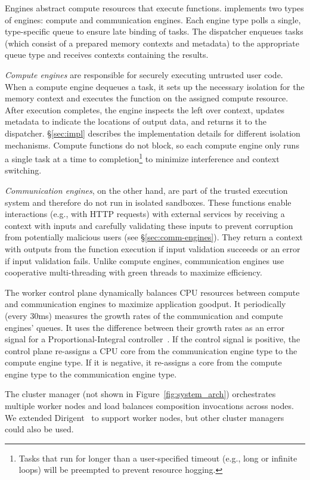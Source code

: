 Engines abstract compute resources that execute functions.
\dandelion implements two types of engines: compute and communication engines. 
Each engine type polls a single, type-specific queue to ensure late binding of tasks.
The dispatcher enqueues tasks (which consist of a prepared memory contexts and metadata) to the appropriate queue type and receives contexts containing the results.

\textit{Compute engines} are responsible for securely executing untrusted user code.
When a compute engine dequeues a task, it sets up the necessary isolation for the memory context and executes the function on the assigned compute resource.
After execution completes, the engine inspects the left over context, updates metadata to indicate the locations of output data, and returns it to the dispatcher. 
\S\ref{sec:impl} describes the implementation details for different isolation mechanisms.
Compute functions do not block, so each compute engine only runs a single task at a time to completion\footnote{Tasks that run for longer than a user-specified timeout (e.g., long or infinite loops) will be preempted to prevent resource hogging.} to minimize interference and context switching.

\textit{Communication engines}, on the other hand, are part of the trusted execution system and therefore do not run in isolated sandboxes. These functions enable interactions (e.g., with HTTP requests) with external services by receiving a context with inputs and carefully validating these inputs to prevent corruption from potentially malicious users (see \S\ref{sec:comm-engines}). They return a context with outputs from the function execution if input validation succeeds or an error if input validation fails.
Unlike compute engines, communication engines use cooperative multi-threading with green threads to maximize efficiency.

The worker control plane dynamically balances CPU resources between compute and communication engines to maximize application goodput.
It periodically (every 30ms) measures the growth rates of the communication and compute engines' queues. It uses the difference between their growth rates as an error signal for a Proportional-Integral controller~\cite{astrom1995_pid}.
If the control signal is positive, the control plane re-assigns a CPU core from the communication engine type to the compute engine type. If it is negative, it re-assigns a core from the compute engine type to the communication engine type.

 The cluster manager (not shown in Figure~\ref{fig:system_arch}) orchestrates multiple worker nodes and load balances composition invocations across nodes.
We extended Dirigent~\cite{dirigent} to support \dandelion worker nodes, but other cluster managers could also be used.